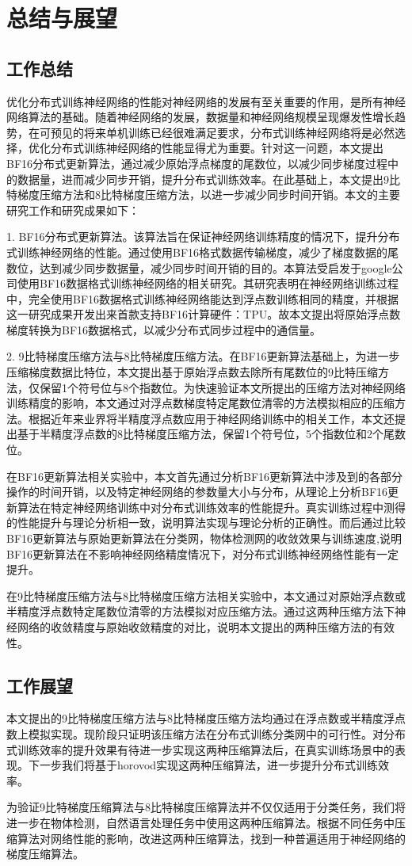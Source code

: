 \chapter{总结与展望}
\section{工作总结}
优化分布式训练神经网络的性能对神经网络的发展有至关重要的作用，是所有神经网络算法的基础。随着神经网络的发展，数据量和神经网络规模呈现爆发性增长趋势，在可预见的将来单机训练已经很难满足要求，分布式训练神经网络将是必然选择，优化分布式训练神经网络的性能显得尤为重要。针对这一问题，本文提出BF16分布式更新算法，通过减少原始浮点梯度的尾数位，以减少同步梯度过程中的数据量，进而减少同步开销，提升分布式训练效率。在此基础上，本文提出9比特梯度压缩方法和8比特梯度压缩方法，以进一步减少同步时间开销。本文的主要研究工作和研究成果如下：

1. BF16分布式更新算法。该算法旨在保证神经网络训练精度的情况下，提升分布式训练神经网络的性能。通过使用BF16格式数据传输梯度，减少了梯度数据的尾数位，达到减少同步数据量，减少同步时间开销的目的。本算法受启发于google公司使用BF16数据格式训练神经网络的相关研究。其研究表明在神经网络训练过程中，完全使用BF16数据格式训练神经网络能达到浮点数训练相同的精度，并根据这一研究成果开发出来首款支持BF16计算硬件：TPU。故本文提出将原始浮点数梯度转换为BF16数据格式，以减少分布式同步过程中的通信量。

2. 9比特梯度压缩方法与8比特梯度压缩方法。在BF16更新算法基础上，为进一步压缩梯度数据比特位，本文提出基于原始浮点数去除所有尾数位的9比特压缩方法，仅保留1个符号位与8个指数位。为快速验证本文所提出的压缩方法对神经网络训练精度的影响，本文通过对浮点数梯度特定尾数位清零的方法模拟相应的压缩方法。根据近年来业界将半精度浮点数应用于神经网络训练中的相关工作，本文还提出基于半精度浮点数的8比特梯度压缩方法，保留1个符号位，5个指数位和2个尾数位。

在BF16更新算法相关实验中，本文首先通过分析BF16更新算法中涉及到的各部分操作的时间开销，以及特定神经网络的参数量大小与分布，从理论上分析BF16更新算法在特定神经网络训练中对分布式训练效率的性能提升。真实训练过程中测得的性能提升与理论分析相一致，说明算法实现与理论分析的正确性。而后通过比较BF16更新算法与原始更新算法在分类网，物体检测网的收敛效果与训练速度,说明BF16更新算法在不影响神经网络精度情况下，对分布式训练神经网络性能有一定提升。

在9比特梯度压缩方法与8比特梯度压缩方法相关实验中，本文通过对原始浮点数或半精度浮点数特定尾数位清零的方法模拟对应压缩方法。通过这两种压缩方法下神经网络的收敛精度与原始收敛精度的对比，说明本文提出的两种压缩方法的有效性。
\section{工作展望}
本文提出的9比特梯度压缩方法与8比特梯度压缩方法均通过在浮点数或半精度浮点数上模拟实现。现阶段只证明该压缩方法在分布式训练分类网中的可行性。对分布式训练效率的提升效果有待进一步实现这两种压缩算法后，在真实训练场景中的表现。下一步我们将基于horovod实现这两种压缩算法，进一步提升分布式训练效率。

为验证9比特梯度压缩算法与8比特梯度压缩算法并不仅仅适用于分类任务，我们将进一步在物体检测，自然语言处理任务中使用这两种压缩算法。根据不同任务中压缩算法对网络性能的影响，改进这两种压缩算法，找到一种普遍适用于神经网络的梯度压缩算法。